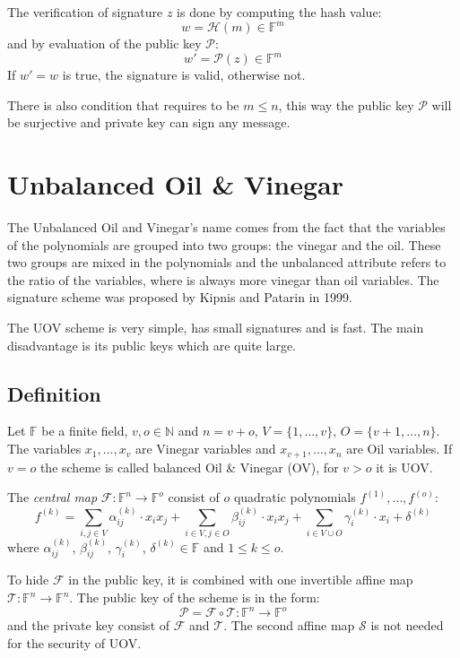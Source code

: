 \documentclass[thesis=M,english]{FITthesis}[2019/12/23]
\begin{document}
The verification of signature $z$ is done by computing the hash value:
\[
	w = \mathcal{H}(m) \in \mathbb{F}^m
\]
and by evaluation of the public key $\mathcal{P}$:
\[
	w' = \mathcal{P}(z) \in \mathbb{F}^m
\]
If $w' = w$ is true, the signature is valid, otherwise not.

There is also condition that requires to be $m \leq n$, this way the public key $\mathcal{P}$ will be surjective and private key can sign any message.

\section{Unbalanced Oil \& Vinegar}
The Unbalanced Oil and Vinegar's name comes from the fact that the variables of the polynomials are grouped into two groups: the vinegar and the oil. These two groups are mixed in the polynomials and the unbalanced attribute refers to the ratio of the variables, where is always more vinegar than oil variables. The signature scheme was proposed by Kipnis and Patarin in 1999.

\bigskip
\noindent
The UOV scheme is very simple, has small signatures and is fast. The main disadvantage is its public keys which are quite large.

\subsection{Definition}
Let $\mathbb{F}$ be a finite field, $v,o \in \mathbb{N}$ and $n=v+o$, $V=\{1, \ldots, v\}$, $O=\{v+1, \ldots, n\}$. The variables $x_1, \ldots, x_v$ are Vinegar variables and $x_{v+1}, \ldots, x_n$ are Oil variables. If $v=o$ the scheme is called balanced Oil \& Vinegar (OV), for $v>o$ it is UOV.

\bigskip
\noindent
The \textit{central map} $\mathcal{F}:\mathbb{F}^n \rightarrow \mathbb{F}^o$ consist of $o$ quadratic polynomials $f^{(1)}, \ldots, f^{(o)}$:
\[
	f^{(k)} = \sum\limits_{i,j \in V}{\alpha_{ij}^{(k)} \cdot x_ix_j} +  \sum\limits_{i \in V,j \in O}{\beta_{ij}^{(k)} \cdot x_ix_j}+ \sum\limits_{i \in V \cup O}{\gamma_{i}^{(k)} \cdot x_i} + \delta^{(k)}
\]
where $\alpha_{ij}^{(k)}$, $\beta_{ij}^{(k)}$, $\gamma_{i}^{(k)}$, $\delta^{(k)} \in \mathbb{F}$ and $1 \leq k \leq o$.

\bigskip
\noindent
To hide $\mathcal{F}$ in the public key, it is combined with one invertible affine map $\mathcal{T}: \mathbb{F}^n \rightarrow \mathbb{F}^n$. The public key of the scheme is in the form:
\[
	\mathcal{P} = \mathcal{F} \circ \mathcal{T} : \mathbb{F}^n \rightarrow \mathbb{F}^o
\]
and the private key consist of $\mathcal{F}$ and $\mathcal{T}$. The second affine map $\mathcal{S}$ is not needed for the security of UOV.
\end{document}
